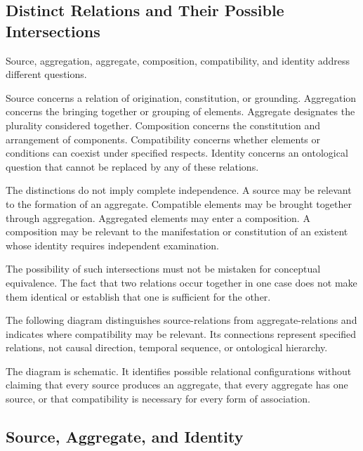 \subsection{Distinct Relations and Their Possible Intersections}

Source, aggregation, aggregate, composition,
compatibility, and identity address different
questions.

Source concerns a relation of origination,
constitution, or grounding. Aggregation
concerns the bringing together or grouping
of elements. Aggregate designates the
plurality considered together. Composition
concerns the constitution and arrangement
of components. Compatibility concerns
whether elements or conditions can coexist
under specified respects. Identity concerns
an ontological question that cannot be
replaced by any of these relations.

The distinctions do not imply complete
independence. A source may be relevant
to the formation of an aggregate. Compatible
elements may be brought together through
aggregation. Aggregated elements may enter
a composition. A composition may be relevant
to the manifestation or constitution of
an existent whose identity requires
independent examination.

The possibility of such intersections
must not be mistaken for conceptual
equivalence. The fact that two relations
occur together in one case does not make
them identical or establish that one
is sufficient for the other.

The following diagram distinguishes
source-relations from aggregate-relations
and indicates where compatibility may
be relevant. Its connections represent
specified relations, not causal direction,
temporal sequence, or ontological hierarchy.



The diagram is schematic. It identifies
possible relational configurations without
claiming that every source produces an
aggregate, that every aggregate has one
source, or that compatibility is necessary
for every form of association.


\subsection{Source, Aggregate, and Identity}

